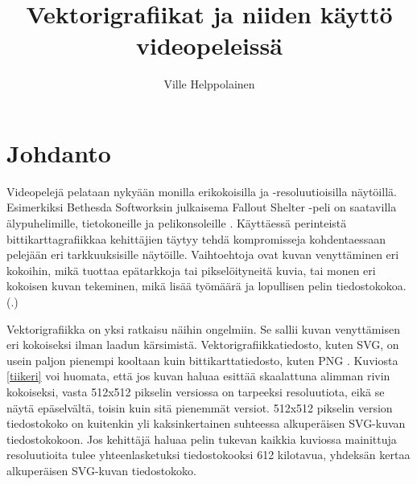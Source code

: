\documentclass[utf8,bachelor]{gradu3}
\newcommand{\parencitedot}[1]{(\cite{#1}.)}
\begin{document}
\title{Vektorigrafiikat ja niiden käyttö videopeleissä}


\author{Ville Helppolainen}

\maketitle

\mainmatter


\chapter{Johdanto}

Videopelejä pelataan nykyään monilla erikokoisilla ja -resoluutioisilla näytöillä. Esimerkiksi Bethesda Softworksin julkaisema Fallout Shelter -peli on saatavilla älypuhelimille, tietokoneille ja pelikonsoleille \parencite{RefWorks:doc:5bd6d887e4b0a1f99c62e6de}. Käyttäessä perinteistä bittikarttagrafiikkaa kehittäjien täytyy tehdä kompromisseja kohdentaessaan pelejään eri tarkkuuksisille näytöille. Vaihtoehtoja ovat kuvan venyttäminen eri kokoihin, mikä tuottaa epätarkkoja tai pikselöityneitä kuvia, tai monen eri kokoisen kuvan tekeminen, mikä lisää työmäärä ja lopullisen pelin tiedostokokoa. \parencitedot{RefWorks:doc:5bd8319de4b03ae5c9b276b8}

Vektorigrafiikka on yksi ratkaisu näihin ongelmiin. Se sallii kuvan venyttämisen eri kokoiseksi ilman laadun kärsimistä. Vektorigrafiikkatiedosto, kuten SVG, on usein paljon pienempi kooltaan kuin bittikarttatiedosto, kuten PNG \parencites{RefWorks:doc:5bdc5224e4b05afcfde5b159}{RefWorks:doc:5bdc5292e4b05afcfde5b171}. Kuviosta \ref{tiikeri} voi huomata, että jos kuvan haluaa esittää skaalattuna alimman rivin kokoiseksi, vasta 512x512 pikselin versiossa on tarpeeksi resoluutiota, eikä se näytä epäselvältä, toisin kuin sitä pienemmät versiot. 512x512 pikselin version tiedostokoko on kuitenkin yli kaksinkertainen suhteessa alkuperäisen SVG-kuvan tiedostokokoon. Jos kehittäjä haluaa pelin tukevan kaikkia kuviossa mainittuja resoluutioita tulee yhteenlasketuksi tiedostokooksi 612 kilotavua, yhdeksän kertaa alkuperäisen SVG-kuvan tiedostokoko.
\end{document}
